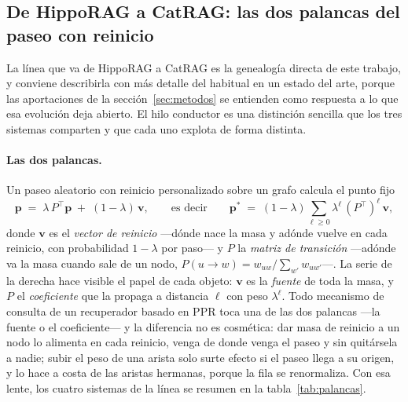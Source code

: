 \documentclass[11pt,a4paper]{article}
\begin{document}
\subsection{De HippoRAG a CatRAG: las dos palancas del paseo con reinicio}
\label{sec:palancas}

La línea que va de HippoRAG a CatRAG es la genealogía directa de este
trabajo, y conviene describirla con más detalle del habitual en un estado
del arte, porque las aportaciones de la sección~\ref{sec:metodos} se
entienden como respuesta a lo que esa evolución deja abierto. El hilo
conductor es una distinción sencilla que los tres sistemas comparten y
que cada uno explota de forma distinta.

\paragraph{Las dos palancas.}
Un paseo aleatorio con reinicio personalizado sobre un grafo calcula el
punto fijo
\begin{equation}
\mathbf{p} \;=\; \lambda\,P^{\!\top}\mathbf{p} \;+\; (1-\lambda)\,\mathbf{v},
\qquad\text{es decir}\qquad
\mathbf{p}^{*} \;=\; (1-\lambda)\sum_{\ell\ge 0}\lambda^{\ell}\,(P^{\!\top})^{\ell}\,\mathbf{v},
\label{eq:neumann}
\end{equation}
donde $\mathbf{v}$ es el \emph{vector de reinicio} ---dónde nace la masa y
adónde vuelve en cada reinicio, con probabilidad $1-\lambda$ por paso--- y
$P$ la \emph{matriz de transición} ---adónde va la masa cuando sale de un
nodo, $P(u\to w)=w_{uw}/\sum_{w'}w_{uw'}$---. La serie de la derecha hace
visible el papel de cada objeto: $\mathbf{v}$ es la \emph{fuente} de toda
la masa, y $P$ el \emph{coeficiente} que la propaga a distancia $\ell$ con
peso $\lambda^{\ell}$. Todo mecanismo de consulta de un recuperador basado
en PPR toca una de las dos palancas ---la fuente o el coeficiente--- y la
diferencia no es cosmética: dar masa de reinicio a un nodo lo alimenta en
cada reinicio, venga de donde venga el paseo y sin quitársela a nadie;
subir el peso de una arista solo surte efecto si el paseo llega a su
origen, y lo hace a costa de las aristas hermanas, porque la fila se
renormaliza. Con esa lente, los cuatro sistemas de la línea se resumen en
la tabla~\ref{tab:palancas}.
\end{document}
